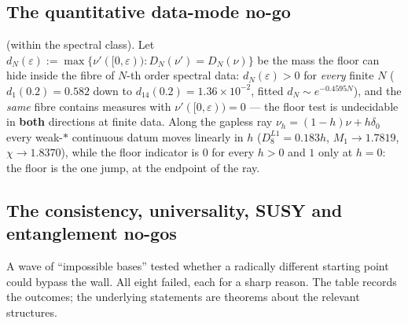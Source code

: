 \subsection{The quantitative data-mode no-go}
\label{sec:datamode}

\LT{} (within the spectral class). Let
$d_N(\varepsilon):=\max\{\nu'([0,\varepsilon)):D_N(\nu')=D_N(\nu)\}$ be the mass the floor can hide
inside the fibre of $N$-th order spectral data: $d_N(\varepsilon)>0$ for \emph{every} finite $N$
($d_1(0.2)=0.582$ down to $d_{14}(0.2)=1.36\times10^{-2}$, fitted $d_N\sim e^{-0.4595N}$), and the
\emph{same} fibre contains measures with $\nu'([0,\varepsilon))=0$ --- the floor test is undecidable
in \textbf{both} directions at finite data. Along the gapless ray $\nu_h=(1-h)\nu+h\delta_0$ every
weak-$*$ continuous datum moves linearly in $h$ ($D_8^{L1}=0.183h$, $M_1\to1.7819$,
$\chi\to1.8370$), while the floor indicator is $0$ for every $h>0$ and $1$ only at $h=0$: the floor
is the one jump, at the endpoint of the ray.

\subsection{The consistency, universality, SUSY and entanglement no-gos}

A wave of ``impossible bases'' tested whether a radically different starting point could bypass
the wall. All eight failed, each for a sharp reason. The table records the outcomes; the
underlying statements are theorems about the relevant structures.

